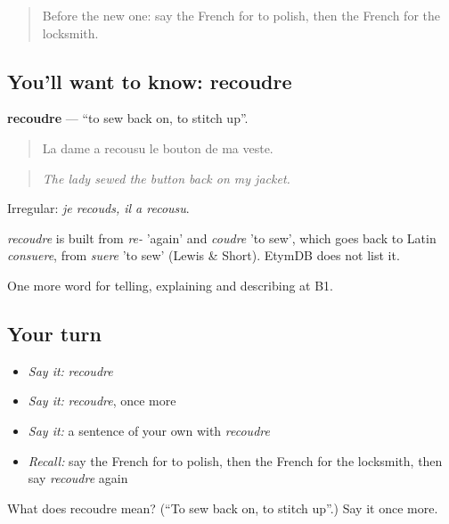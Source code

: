 \label{lesson:FR-C446-recoudre}



\begin{quote}
Before the new one: say the French for to polish, then the French for the locksmith.
\end{quote}

\subsection*{You'll want to know: recoudre}
\textbf{recoudre} — \textquotedblleft{}to sew back on, to stitch up\textquotedblright{}.

\begin{quote}
La dame a recousu le bouton de ma veste.
\end{quote}

\begin{quote}
\emph{The lady sewed the button back on my jacket.}
\end{quote}

Irregular: \emph{je recouds, il a recousu}.

\begin{cousinweb}
\emph{recoudre} is built from \emph{re-} 'again' and \emph{coudre} 'to sew', which goes back to Latin \emph{consuere}, from \emph{suere} 'to sew' (Lewis \& Short). EtymDB does not list it.
\end{cousinweb}

\begin{grammarlens}[title={What you've built}]
One more word for telling, explaining and describing at B1.
\end{grammarlens}

\subsection*{Your turn}
\begin{itemize}
\raggedright
  \item \emph{Say it:} \emph{recoudre}
  \item \emph{Say it:} \emph{recoudre}, once more
  \item \emph{Say it:} a sentence of your own with \emph{recoudre}
  \item \emph{Recall:} say the French for to polish, then the French for the locksmith, then say \emph{recoudre} again
\end{itemize}

\begin{tcolorbox}[breakable,colback=teal!4,colframe=teal!35!black,title={Before you move on}]
What does recoudre mean? (\textquotedblleft{}To sew back on, to stitch up\textquotedblright{}.) Say it once more.
\end{tcolorbox}
